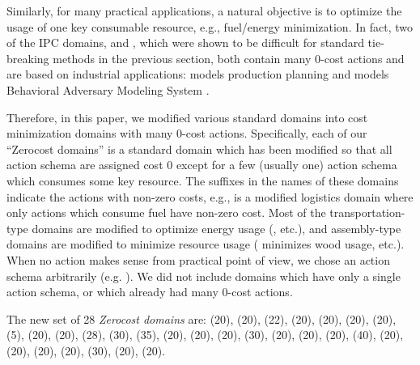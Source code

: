 Similarly, for many practical applications, a natural objective is to
optimize the usage of one key consumable resource, e.g., fuel/energy
minimization.  In fact, two of the IPC domains,  and
, which were shown to be difficult for standard tie-breaking
methods in the previous section, both contain many 0-cost actions
and are based on industrial applications: %
 models
production planning \cite{fink1999applications} and 
models Behavioral Adversary Modeling System \cite[minimizing decryption,
data transfer, etc.]{boddy2005course}.

Therefore, %
in this paper, we modified various standard domains
into cost minimization domains with many 0-cost actions.
Specifically, each of our ``Zerocost domains'' is a standard domain which has been modified so that all action schema are assigned
cost 0 except for a few (usually one) action schema which consumes some key resource.
The suffixes in the names of these domains indicate the actions with non-zero costs, 
e.g.,  is a modified logistics domain where only actions which consume fuel have non-zero cost.
Most of the transportation-type domains are modified to optimize 
energy usage (,  etc.), and  assembly-type domains are modified to minimize resource usage
( minimizes wood usage, etc.).
When no action makes sense from practical point of view, we chose an action schema arbitrarily (e.g. ).
We did not
include domains which have only a single action schema, or which already had many 0-cost actions.

The new set of 28 \emph{Zerocost domains} are:
 (20),  (20),  (22),  (20),
 (20),  (20),  (20),  (5),
 (20),  (20),  (28),  (30),
 (35),  (20),  (20),
 (20),  (30),  (20),
 (20),  (20),  (40),
 (20),  (20),  (20),
 (20),  (30),  (20),
 (20).

